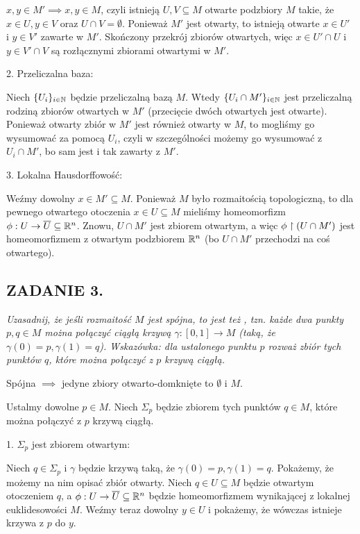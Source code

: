 $x,y\in M'\implies x,y\in M$, czyli istnieją $U,V\subseteq M$ otwarte podzbiory $M$ takie, że $x\in U,y\in V$ oraz $U\cap V=\emptyset$. Ponieważ $M'$ jest otwarty, to istnieją otwarte $x\in U'$ i $y\in V'$ zawarte w $M'$. Skończony przekrój zbiorów otwartych, więc $x\in U'\cap U$ i $y\in V'\cap V$ są rozłącznymi zbiorami otwartymi w $M'$.

2. Przeliczalna baza:

Niech $\{U_i\}_{i\in\mathbb{N}}$ będzie przeliczalną bazą $M$. Wtedy $\{U_i\cap M'\}_{i\in\mathbb{N}}$ jest przeliczalną rodziną zbiorów otwartych w $M'$ (przecięcie dwóch otwartych jest otwarte). Ponieważ otwarty zbiór w $M'$ jest również otwarty w $M$, to mogliśmy go wysumować za pomocą $U_i$, czyli w szczególności możemy go wysumować z $U_i\cap M'$, bo sam jest i tak zawarty z $M'$.

3. Lokalna Hausdorffowość:

Weźmy dowolny $x\in M'\subseteq M$. Ponieważ $M$ było rozmaitością topologiczną, to dla pewnego otwartego otoczenia $x\in U\subseteq M$ mieliśmy homeomorfizm $\phi:U\to\overline U\subseteq\mathbb{R}^n$. Znowu, $U\cap M'$ jest zbiorem otwartym, a więc $\phi\upharpoonright (U\cap M')$ jest homeomorfizmem z otwartym podzbiorem $\mathbb{R}^n$ (bo $U\cap M'$ przechodzi na coś otwartego).

\subsection*{ZADANIE 3.}
\emph{\color{pink}Uzasadnij, że jeśli rozmaitość $M$ jest spójna, to jest też , tzn. każde dwa punkty $p,q\in M$ można połączyć ciągłą krzywą $\gamma:[0,1]\to M$ (taką, że $\gamma(0)=p,\gamma(1)=q$). Wskazówka: dla ustalonego punktu $p$ rozważ zbiór tych punktów $q$, które można połączyć z $p$ krzywą ciągłą.}
\medskip

Spójna $\implies$ jedyne zbiory otwarto-domknięte to $\emptyset$ i $M$.

Ustalmy dowolne $p\in M$. Niech $\Sigma_p$ będzie zbiorem tych punktów $q\in M$, które można połączyć z $p$ krzywą ciągłą. 


1. $\Sigma_p$ jest zbiorem otwartym:

Niech $q\in\Sigma_p$ i $\gamma$ będzie krzywą taką, że $\gamma(0)=p,\gamma(1)=q$. Pokażemy, że możemy na nim opisać zbiór otwarty. Niech $q\in U\subseteq M$ będzie otwartym otoczeniem $q$, a $\phi:U\to\overline U\subseteq \mathbb{R}^n$ będzie homeomorfizmem wynikającej z lokalnej euklidesowości $M$. Weźmy teraz dowolny $y\in U$ i pokażemy, że wówczas istnieje krzywa z $p$ do $y$.

